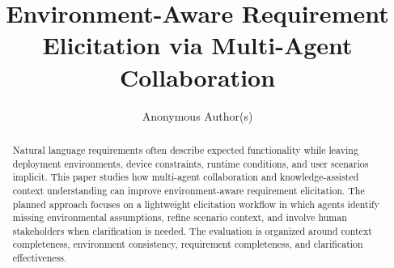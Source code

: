 \documentclass[sigconf,anonymous,review]{acmart}
\title{Environment-Aware Requirement Elicitation via Multi-Agent Collaboration}
\author{Anonymous Author(s)}
\affiliation{
  \institution{Anonymous Institution}
  \country{Anonymous Country}
}
\begin{document}
\begin{abstract}
Natural language requirements often describe expected functionality while leaving deployment environments, device constraints, runtime conditions, and user scenarios implicit.
This paper studies how multi-agent collaboration and knowledge-assisted context understanding can improve environment-aware requirement elicitation.
The planned approach focuses on a lightweight elicitation workflow in which agents identify missing environmental assumptions, refine scenario context, and involve human stakeholders when clarification is needed.
The evaluation is organized around context completeness, environment consistency, requirement completeness, and clarification effectiveness.
\end{abstract}




\maketitle



















\appendix



\end{document}
